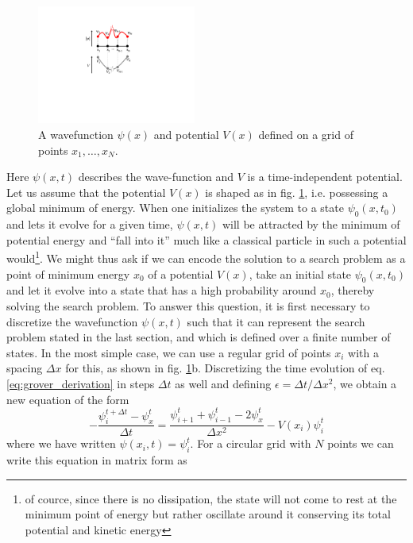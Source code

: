 \begin{figure}
\vspace{-1cm}
\includegraphics[width=5.2cm]{"./material/papers/grover/grover_derivation_schroedinger"}
\caption{A wavefunction $\psi(x)$ and potential $V(x)$ defined on a grid of points $x_1,\hdots,x_N$.}
\label{fig:GroverDerivationSchroedinger}
\end{figure}


Here $\psi(x,t)$ describes the wave-function and $V$ is a time-independent potential. Let us assume that the potential $V(x)$ is shaped as in fig. \ref{fig:GroverDerivationSchroedinger}, i.e. possessing a global minimum of energy. When one initializes the system to a state $\psi_0(x,t_0)$ and lets it evolve for a given time, $\psi(x,t)$ will be attracted by the minimum of potential energy and ``fall into it'' much like a classical particle in such a potential would\footnote{of cource, since there is no dissipation, the state will not come to rest at the minimum point of energy but rather oscillate around it conserving its total potential and kinetic energy}. We might thus ask if we can encode the solution to a search problem as a point of minimum energy $x_0$ of a potential $V(x)$, take an initial state $\psi_0(x,t_0)$ and let it evolve into a state that has a high probability around $x_0$, thereby solving the search problem. To answer this question, it is first necessary to discretize the wavefunction $\psi(x,t)$ such that it can represent the search problem stated in the last section, and which is defined over a finite number of states. In the most simple case, we can use a regular grid of points $x_i$ with a spacing $\Delta x$ for this, as shown in fig. \ref{fig:GroverDerivationSchroedinger}b. Discretizing the time evolution of eq. \ref{eq:grover_derivation} in steps $\Delta t$ as well and defining $\epsilon = \Delta t/\Delta x^2$, we obtain a new equation of the form
%
\begin{equation}
-\frac{\psi_i^{t+\Delta t}-\psi_x^{t}}{\Delta t} = \frac{\psi_{i+1}^t+\psi_{i-1}^t-2\psi_x^t}{\Delta x^2} -V(x_i)\psi_i^t
\end{equation}
%
where we have written $\psi(x_i,t)=\psi_i^t$. For a circular grid with $N$ points we can write this equation in matrix form as
